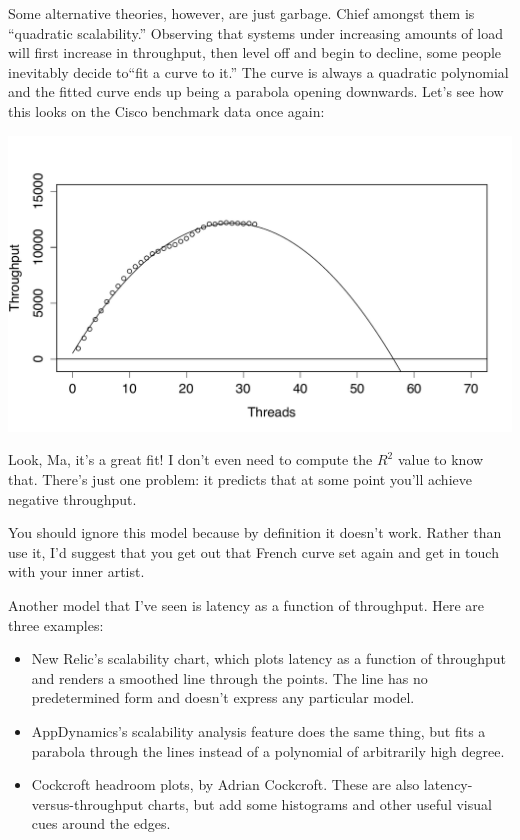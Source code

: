 \documentclass{vivid_layout}
\begin{document}
Some alternative theories, however, are just garbage. Chief amongst them is
``quadratic scalability.'' Observing that systems under increasing amounts of
load will first increase in throughput, then level off and begin to decline,
some people inevitably decide to``fit a curve to it.'' The curve
is always a quadratic polynomial and the fitted curve ends up being a parabola
opening downwards. Let's see how this looks on the Cisco benchmark data 
once again:
\begin{center}
\includegraphics[width=.85\linewidth]{scalability/quadratic}
\end{center}

Look, Ma, it's a great fit! I don't even need to compute the $R^2$ value to know
that. There's just one problem: it predicts that at some point you'll achieve
negative throughput.

You should ignore this model because by definition it doesn't work. Rather than
use it, I'd suggest that you get out that French curve set again and get in
touch with your inner artist.

Another model that I've seen is latency as a function of throughput. Here
are three examples:

\begin{itemize}
\item New Relic's scalability chart, which plots latency as a function of
throughput and renders a smoothed line through the points. The line has no
predetermined form and doesn't express any particular model.
\item AppDynamics's scalability analysis feature does the same thing, but fits a
parabola through the lines instead of a polynomial of arbitrarily high degree.
\item Cockcroft headroom plots, by Adrian Cockcroft. These are also
latency-versus-throughput charts, but add some histograms and other useful
visual cues around the edges.
\end{itemize}
\end{document}
